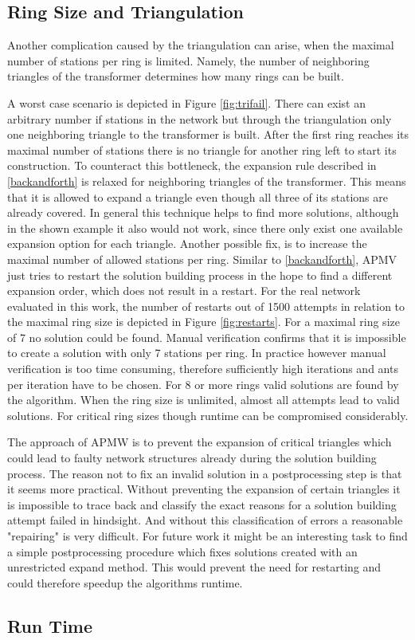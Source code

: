 \subsection{Ring Size and Triangulation}\label{sec:tri_problem}
Another complication caused by the triangulation can arise, when the maximal number of stations per ring is limited. Namely, the number of neighboring triangles of the transformer determines how many rings can be built.

A worst case scenario is depicted in Figure \ref{fig:trifail}. There can exist an arbitrary number if stations in the network but through the triangulation only one neighboring triangle to the transformer is built. After the first ring reaches its maximal number of stations there is no triangle for another ring left to start its construction. To counteract this bottleneck, the expansion rule described in \ref{backandforth} is relaxed for neighboring triangles of the transformer. This means that it is allowed to expand a triangle even though all three of its stations are already covered. In general this technique helps to find more solutions, although in the shown example it also would not work, since there only exist one available expansion option for each triangle. Another possible fix, is to increase the maximal number of allowed stations per ring. Similar to \ref{backandforth}, APMV just tries to restart the solution building process in the hope to find a different expansion order, which does not result in a restart. For the real network evaluated in this work, the number of restarts out of 1500 attempts in relation to the maximal ring size is depicted in Figure \ref{fig:restarts}. For a maximal ring size of 7 no solution could be found. Manual verification confirms that it is impossible to create a solution with only 7 stations per ring. In practice however manual verification is too time consuming, therefore sufficiently high iterations and ants per iteration have to be chosen. For 8 or more rings valid solutions are found by the algorithm. When the ring size is unlimited, almost all attempts lead to valid solutions. For critical ring sizes though runtime can be compromised considerably.


The approach of APMW is to prevent the expansion of critical triangles which could lead to faulty network structures already during the solution building process. The reason not to fix an invalid solution in a postprocessing step is that it seems more practical. Without preventing the expansion of certain triangles it is impossible to trace back and classify the exact reasons for a solution building attempt failed in hindsight. And without this classification of errors a reasonable "repairing" is very difficult. For future work it might be an interesting task to find a simple postprocessing procedure which fixes solutions created with an unrestricted expand method. This would prevent the need for restarting and could therefore speedup the algorithms runtime.

\subsection{Run Time}

